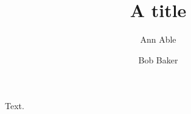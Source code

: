 \documentclass[12pt]{iopart}
\begin{document}
\title{A title}
\author[1]{Ann Able}
\author[2]{Bob Baker}
\address{$^1$Lab Z, Village}
\maketitle
Text.
\end{document}
